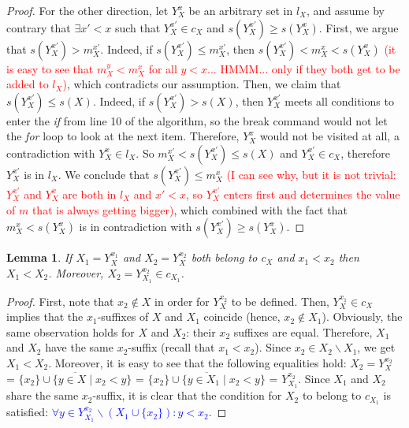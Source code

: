 \documentclass{article}
\newtheorem{lemma}{Lemma}
\newcommand{\added}[1]{\textcolor{blue}{#1}}
\def\s{\mathit{s}}
\newcommand{\cl}[1]{\overline{#1}}
\begin{document}
\begin{proof}
For the other direction, let $Y^x_X$ be an arbitrary set in $l_X$, and assume by contrary that $\exists x'<x$ such that $Y^{x'}_X \in c_X$ and $\s(Y^{x'}_X) \geq \s(Y^x_X)$. First, we argue that $\s(Y^{x'}_X) > m^{x'}_X$. Indeed, if $\s(Y^{x'}_X)\leq m^{x'}_X$, then $\s(Y^{x'}_X)< m^x_X<\s(Y^x_X)$ \textcolor{red}{(it is easy to see that $m^y_X < m^x_X$ for all $y<x$... HMMM... only if they both get to be added to $l_X$)}, which contradicts our assumption. Then, we claim that $\s(Y^{x'}_X) \leq \s(X)$. Indeed, if $\s(Y^{x'}_X)> \s(X)$, then $Y^{x'}_X$ meets all conditions to enter the \emph{if} from line 10 of the algorithm, so the break command would not let the \emph{for} loop to look at the next item. Therefore, $Y^x_X$ would not be visited at all, a contradiction with  $Y^x_X \in l_X$. So $m^{x'}_X < \s(Y^{x'}_X) \leq \s(X)$ and $Y^{x'}_X \in c_X$, therefore $Y^{x'}_X$ is in $l_X$. 
We conclude that $\s(Y^{x'}_X) \leq m^x_X$ \textcolor{red}{(I can see why, but it is not trivial: $Y_X^{x'}$ and $Y_X^{x}$ are both in $l_X$ and $x'<x$, so $Y_X^{x'}$ enters first and determines the value of $m$ that is always getting bigger)}, which combined with the fact that $m^x_X <\s(Y^x_X)$ is in contradiction with $\s(Y^{x'}_X) \geq \s(Y^x_X)$.

\end{proof}


\begin{lemma}\label{lem:brothersets}
If $X_1=Y^{x_1}_X$ and $X_2=Y^{x_2}_X$ both belong to $c_X$ and $x_1<x_2$ 
then $X_1 < X_2$. Moreover, $X_2 = Y^{x_2}_{X_1} \in c_{X_1}$.
\end{lemma}

\begin{proof} %
First, note that $x_2 \notin X$ in order for $Y^{x_2}_X$ to be defined. Then, $Y^{x_1}_X \in c_X$ implies that the $x_1$-suffixes of $X$ and $X_1$ coincide (hence, $x_2 \notin X_1$). Obviously, the same observation holds for $X$ and $X_2$: their $x_2$ suffixes are equal. Therefore, $X_1$ and $X_2$ have the same $x_2$-suffix (recall that $x_1<x_2$). Since $x_2 \in X_2 \backslash X_1$, we get  $X_1 < X_2$. Moreover, it is easy to see that the following equalities hold: $X_2=Y^{x_2}_X$ = $\cl{\{x_2\}\cup \{y \in X \mid x_2 < y\}}$ = $\cl{\{x_2\}\cup \{y \in X_1 \mid x_2 < y\}}$ = $Y^{x_2}_{X_1}$. Since $X_1$ and $X_2$ share the same $x_2$-suffix,  it is clear that the condition for $X_2$ to belong to $c_{X_1}$ is satisfied: 
\added{$\forall y \in Y^{x_2}_{X_1} \backslash (X_1 \cup \{x_2\}): y < x_2$.}
\end{proof}
\end{document}
